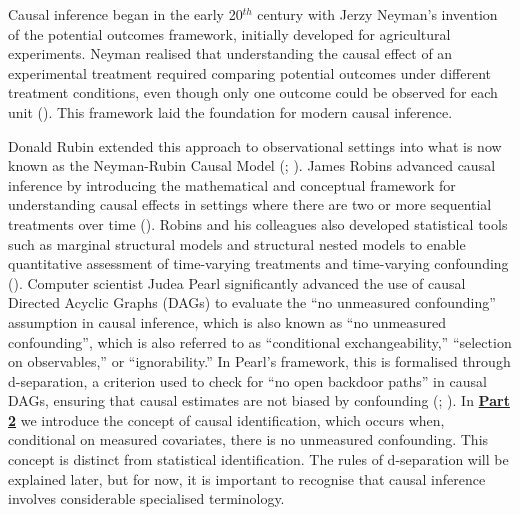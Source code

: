 \documentclass[
  singlecolumn]{article}
\begin{document}
Causal inference began in the early 20\(^{th}\) century with Jerzy
Neyman's invention of the potential outcomes framework, initially
developed for agricultural experiments. Neyman realised that
understanding the causal effect of an experimental treatment required
comparing potential outcomes under different treatment conditions, even
though only one outcome could be observed for each unit
(). This
framework laid the foundation for modern causal inference.

Donald Rubin extended this approach to observational settings into what
is now known as the Neyman-Rubin Causal Model
(;
). James Robins advanced causal
inference by introducing the mathematical and conceptual framework for
understanding causal effects in settings where there are two or more
sequential treatments over time (). Robins and his colleagues also developed statistical tools such
as marginal structural models and structural nested models to enable
quantitative assessment of time-varying treatments and time-varying
confounding ().
Computer scientist Judea Pearl significantly advanced the use of causal
Directed Acyclic Graphs (DAGs) to evaluate the ``no unmeasured
confounding'' assumption in causal inference, which is also known as
``no unmeasured confounding'', which is also referred to as
``conditional exchangeability,'' ``selection on observables,'' or
``ignorability.'' In Pearl's framework, this is formalised through
d-separation, a criterion used to check for ``no open backdoor paths''
in causal DAGs, ensuring that causal estimates are not biased by
confounding (;
). In
\hyperref[section-part2]{\textbf{Part 2}} we introduce the concept of
causal identification, which occurs when, conditional on measured
covariates, there is no unmeasured confounding. This concept is distinct
from statistical identification. The rules of d-separation will be
explained later, but for now, it is important to recognise that causal
inference involves considerable specialised terminology.
\end{document}

